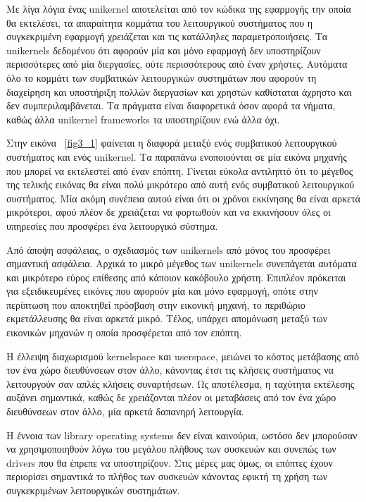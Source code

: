 Με λίγα λόγια ένας unikernel αποτελείται από τον κώδικα της εφαρμογής την οποία
θα εκτελέσει, τα απαραίτητα κομμάτια του λειτουργικού συστήματος που η
συγκεκριμένη εφαρμογή χρειάζεται και τις κατάλληλες παραμετροποιήσεις. Τα
unikernels δεδομένου ότι αφορούν μία και μόνο εφαρμογή δεν υποστηρίζουν
περισσότερες από μία διεργασίες, ούτε περισσότερους από έναν χρήστες. Αυτόματα
όλο το κομμάτι των συμβατικών λειτουργικών συστημάτων που αφορούν τη διαχείρηση
και υποστήριξη πολλών διεργασίων και χρηστών καθίσταται άχρηστο και δεν
συμπεριλαμβάνεται. Τα πράγματα είναι διαφορετικά όσον αφορά τα νήματα, καθώς
άλλα unikernel frameworks τα υποστηρίζουν ενώ άλλα όχι. 

Στην εικόνα ~\ref{fig3_1} φαίνεται η διαφορά μεταξύ ενός συμβατικού λειτουργικού
συστήματος και ενός unikernel. Τα παραπάνω ενοποιούνται σε μία εικόνα μηχανής
που μπορεί να εκτελεστεί από έναν επόπτη. Γίνεται εύκολα αντιληπτό ότι το
μέγεθος της τελικής εικόνας θα είναι πολύ μικρότερο από αυτή ενός συμβατικού
λειτουργικού συστήματος. Μία ακόμη συνέπεια αυτού είναι ότι οι χρόνοι εκκίνησης
θα είναι αρκετά μικρότεροι, αφού πλέον δε χρειάζεται να φορτωθούν και να
εκκινήσουν όλες οι υπηρεσίες που προσφέρει ένα λειτουργικό σύστημα. 

Από άποψη ασφάλειας, ο σχεδιασμός των unikernels από μόνος του προσφέρει
σημαντική ασφάλεια. Αρχικά το μικρό μέγεθος των unikernels συνεπάγεται αυτόματα
και μικρότερο εύρος επίθεσης από κάποιον κακόβουλο χρήστη. Επιπλέον πρόκειται
για εξειδικευμένες εικόνες που αφορούν μία και μόνο εφαρμογή, οπότε στην
περίπτωση που αποκτηθεί πρόσβαση στην εικονική μηχανή, το περιθώριο
εκμετάλλευσης θα είναι αρκετά μικρό. Τέλος, υπάρχει απομόνωση μεταξύ των
εικονικών μηχανών η οποία προσφέρεται από τον επόπτη. 

H έλλειψη διαχωρισμού kernelspace και userspace, μειώνει το κόστος
μετάβασης από τον ένα χώρο διευθύνσεων στον άλλο, κάνοντας έτσι τις κλήσεις
συστήματος να λειτουργούν σαν απλές κλήσεις συναρτήσεων. Ως αποτέλεσμα, η
ταχύτητα εκτέλεσης αυξάνει σημαντικά, καθώς δε χρειάζονται πλέον οι μεταβάσεις
από τον ένα χώρο διευθύνσεων στον άλλο, μία αρκετά δαπανηρή λειτουργία.

Η έννοια των library operating systems δεν είναι καινούρια, ωστόσο δεν μπορούσαν
να χρησιμοποιηθούν λόγω του μεγάλου πλήθους των συσκευών και συνεπώς των drivers
που θα έπρεπε να υποστηρίζουν. Στις μέρες μας όμως, οι επόπτες έχουν περιορίσει
σημαντικά το πλήθος των συσκευών κάνοντας εφικτή τη χρήση των συγκεκριμένων
λειτουργικών συστημάτων. 
 
